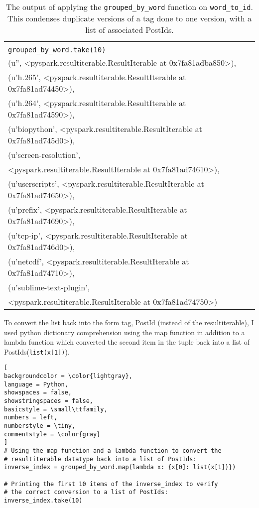 \documentclass[]{article}
\newcommand{\code}[1]{\colorbox{light-gray}{\texttt{#1}}}
\begin{document}
\begin{table}[!ht]
	\begin{center}
		\caption{The output of applying the \code{grouped\_by\_word} function on \code{word\_to\_id}.  This condenses duplicate versions of a tag done to one version, with a list of associated PostIds.}
		\label{tab:table1}
		\begin{tabular}{|l|} 
			\hline
			\\
			\code{grouped\_by\_word.take(10)}\\
			\hline
			(u'', <pyspark.resultiterable.ResultIterable at 0x7fa81adba850>),\\
			(u'h.265', <pyspark.resultiterable.ResultIterable at 0x7fa81ad74450>),\\
			(u'h.264', <pyspark.resultiterable.ResultIterable at 0x7fa81ad74590>),\\
			(u'biopython', <pyspark.resultiterable.ResultIterable at 0x7fa81ad745d0>),\\
			(u'screen-resolution',\\
			<pyspark.resultiterable.ResultIterable at 0x7fa81ad74610>),\\
			(u'userscripts', <pyspark.resultiterable.ResultIterable at 0x7fa81ad74650>),\\
			(u'prefix', <pyspark.resultiterable.ResultIterable at 0x7fa81ad74690>),\\
			(u'tcp-ip', <pyspark.resultiterable.ResultIterable at 0x7fa81ad746d0>),\\
			(u'netcdf', <pyspark.resultiterable.ResultIterable at 0x7fa81ad74710>),\\
			(u'sublime-text-plugin',\\
			<pyspark.resultiterable.ResultIterable at 0x7fa81ad74750>)\\
			\hline
		\end{tabular}
	\end{center}
\end{table}

To convert the list back into the form tag, PostId (instead of the resultiterable), I used python dictionary comprehension using the map function in addition to a lambda function which converted the second item in the tuple back into a list of PostIds(\code{list(x[1])}).

\begin{lstlisting}[
backgroundcolor = \color{lightgray},
language = Python,
showspaces = false,
showstringspaces = false,
basicstyle = \small\ttfamily,
numbers = left,
numberstyle = \tiny,
commentstyle = \color{gray}
]
# Using the map function and a lambda function to convert the
# resultiterable datatype back into a list of PostIds:
inverse_index = grouped_by_word.map(lambda x: {x[0]: list(x[1])})

# Printing the first 10 items of the inverse_index to verify
# the correct conversion to a list of PostIds:
inverse_index.take(10)
\end{lstlisting}
\end{document}
